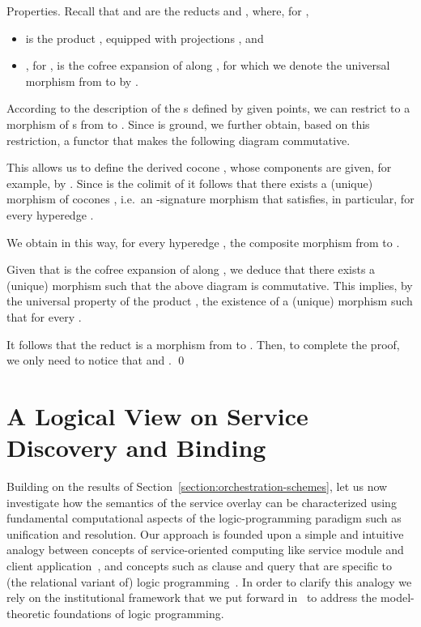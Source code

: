 \documentclass{LMCS}
\begin{document}
\begin{minisection}{Properties.}
    Recall that  and  are the reducts  and , where, for ,
    \begin{itemize}
      
    \item  is the product , equipped with projections , and

    \item , for , is the cofree expansion of  along , for which we denote the universal morphism from  to  by .
      
    \end{itemize}
    According to the description of the s defined by given points, we can restrict  to a morphism of s from  to .
    Since  is ground, we further obtain, based on this restriction, a functor  that makes the following diagram commutative.
    
    This allows us to define the derived cocone , whose components are given, for example, by .
    Since  is the colimit of  it follows that there exists a (unique) morphism of cocones , i.e.\ an \nb-signature morphism  that satisfies, in particular,  for every hyperedge .

    We obtain in this way, for every hyperedge , the composite morphism  from  to .
    
    Given that  is the cofree expansion of  along , we deduce that there exists a (unique) morphism  such that the above diagram is commutative.
    This implies, by the universal property of the product , the existence of a (unique) morphism  such that  for every .
    
    It follows that the reduct  is a morphism from  to .  Then, to complete the proof, we only need to notice that  and .
    \qed
\end{minisection}


  \section{A Logical View on Service Discovery and Binding}
  \label{section:service-discovery-and-binding}

  Building on the results of Section~\ref{section:orchestration-schemes}, let us now investigate how the semantics of the service overlay can be characterized using fundamental computational aspects of the logic-programming paradigm such as unification and resolution.
  Our approach is founded upon a simple and intuitive analogy between concepts of service-oriented computing like service module and client application~\cite{Fiadeiro-Lopes-Bocchi:An-abstract-model-for-service-discovery-and-binding-2011}, and concepts such as clause and query that are specific to (the relational variant of) logic programming~\cite{Lloyd:Foundations-of-Logic-Programming-1987}.
  In order to clarify this analogy we rely on the institutional framework that we put forward in~\cite{Tutu-Fiadeiro:Institution-independent-logic-programming-2015} to address the model-theoretic foundations of logic programming.
\end{document}
